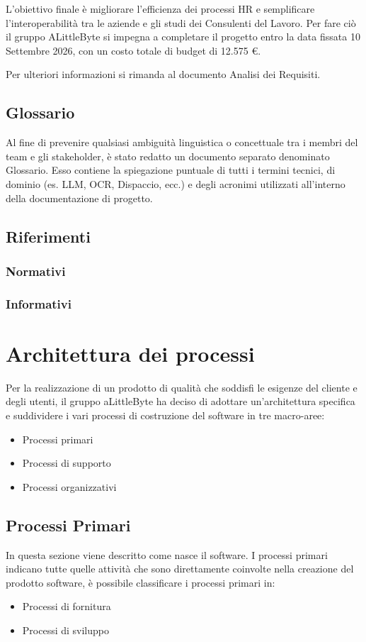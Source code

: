 \documentclass[a4paper,12pt]{article}
\begin{document}
L'obiettivo finale è migliorare l'efficienza dei processi HR e semplificare l'interoperabilità tra le aziende e gli studi dei Consulenti del Lavoro. Per fare ciò il gruppo ALittleByte si impegna a completare il progetto entro la data fissata 10 Settembre 2026, con un costo totale di budget di 12.575 €. 

Per ulteriori informazioni si rimanda al documento Analisi dei Requisiti. 


\subsection{Glossario}

Al fine di prevenire qualsiasi ambiguità linguistica o concettuale tra i membri del team e gli stakeholder, è stato redatto un documento separato denominato Glossario. Esso contiene la spiegazione puntuale di tutti i termini tecnici, di dominio (es. LLM, OCR, Dispaccio, ecc.) e degli acronimi utilizzati all'interno della documentazione di progetto.


\subsection{Riferimenti}

\subsubsection{Normativi}

\subsubsection{Informativi}

\section{Architettura dei processi}
Per la realizzazione di un prodotto di qualità che soddisfi le esigenze del cliente e degli utenti, il gruppo aLittleByte ha deciso di adottare un'architettura specifica e suddividere i vari processi di costruzione del software in tre macro-aree:
\begin{itemize}
    \item Processi primari
    \item Processi di supporto
    \item Processi organizzativi
\end{itemize}

\subsection{Processi Primari}
In questa sezione viene descritto come nasce il software. I processi primari indicano tutte quelle attività che sono direttamente coinvolte nella creazione del prodotto software, è possibile classificare i processi primari in:
\begin{itemize}
    \item Processi di fornitura 
    \item Processi di sviluppo
\end{itemize}
\end{document}
